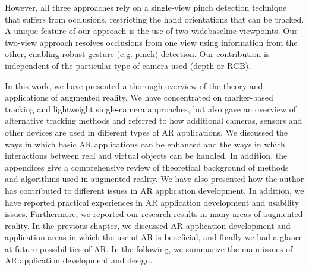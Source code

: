 


 However, all three approaches rely on
a single-view pinch detection technique that suffers from occlusions, restricting the hand orientations that can be tracked.
A unique feature of our approach is the use of two widebaseline
viewpoints. Our two-view approach resolves occlusions
from one view using information from the other, enabling
robust gesture (e.g. pinch) detection. Our contribution
is independent of the particular type of camera used (depth
or RGB).


In this work, we have presented a thorough overview of the theory and applications of augmented reality. We have concentrated on marker-based tracking and lightweight single-camera approaches, but also gave an overview of alternative tracking methods and referred to how additional cameras, sensors and other devices are used in different types of AR applications. We discussed the ways in which basic AR applications can be enhanced and the ways in which interactions between real and virtual objects can be handled. In addition, the appendices give a comprehensive review of theoretical background of methods and algorithms used in augmented reality. We have also presented how the author has contributed to different issues in AR application development. In addition, we have reported practical experiences in AR application development and usability issues. Furthermore, we reported our research results in many areas of augmented reality. In the previous chapter, we discussed AR application development and application areas in which the use of AR is beneficial, and finally we had a glance at future possibilities of AR. In the following, we summarize the main issues of AR application development and design.

